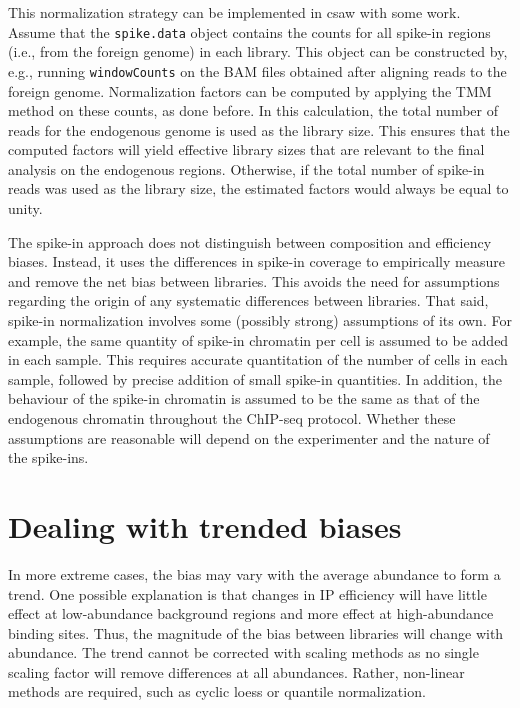\documentclass[12pt]{report}
\renewenvironment{Schunk}{\vspace{0pt}}{\vspace{0pt}}
\newcommand{\pkgname}{csaw}
\newcommand{\code}[1]{{\small\texttt{#1}}}
\begin{document}
This normalization strategy can be implemented in \pkgname{} with some work.
Assume that the \code{spike.data} object contains the counts for all spike-in regions (i.e., from the foreign genome) in each library.
This object can be constructed by, e.g., running \code{windowCounts} on the BAM files obtained after aligning reads to the foreign genome.
Normalization factors can be computed by applying the TMM method on these counts, as done before.
In this calculation, the total number of reads for the endogenous genome is used as the library size.
This ensures that the computed factors will yield effective library sizes that are relevant to the final analysis on the endogenous regions.
Otherwise, if the total number of spike-in reads was used as the library size, the estimated factors would always be equal to unity.


\begin{Schunk}
\end{Schunk}

The spike-in approach does not distinguish between composition and efficiency biases.
Instead, it uses the differences in spike-in coverage to empirically measure and remove the net bias between libraries.
This avoids the need for assumptions regarding the origin of any systematic differences between libraries.
That said, spike-in normalization involves some (possibly strong) assumptions of its own.
For example, the same quantity of spike-in chromatin per cell is assumed to be added in each sample.
This requires accurate quantitation of the number of cells in each sample, followed by precise addition of small spike-in quantities.
In addition, the behaviour of the spike-in chromatin is assumed to be the same as that of the endogenous chromatin throughout the ChIP-seq protocol.
Whether these assumptions are reasonable will depend on the experimenter and the nature of the spike-ins. 

\section{Dealing with trended biases}
In more extreme cases, the bias may vary with the average abundance to form a trend. 
One possible explanation is that changes in IP efficiency will have little effect at low-abundance background regions and more effect at high-abundance binding sites. 
Thus, the magnitude of the bias between libraries will change with abundance. 
The trend cannot be corrected with scaling methods as no single scaling factor will remove differences at all abundances.
Rather, non-linear methods are required, such as cyclic loess or quantile normalization.
\end{document}
